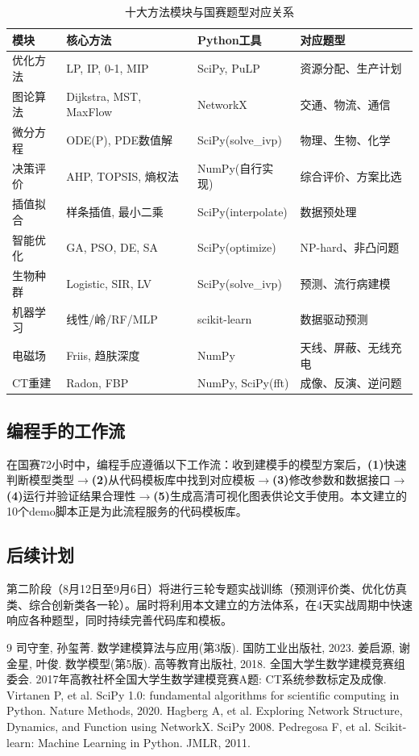 \documentclass[12pt,a4paper]{ctexart}
\begin{document}
\begin{table}[htbp]
\centering
\caption{十大方法模块与国赛题型对应关系}
\begin{tabular}{@{}llll@{}}
\toprule
\textbf{模块} & \textbf{核心方法} & \textbf{Python工具} & \textbf{对应题型} \\
\midrule
优化方法 & LP, IP, 0-1, MIP & SciPy, PuLP & 资源分配、生产计划 \\
图论算法 & Dijkstra, MST, MaxFlow & NetworkX & 交通、物流、通信 \\
微分方程 & ODE(P), PDE数值解 & SciPy(solve\_ivp) & 物理、生物、化学 \\
决策评价 & AHP, TOPSIS, 熵权法 & NumPy(自行实现) & 综合评价、方案比选 \\
插值拟合 & 样条插值, 最小二乘 & SciPy(interpolate) & 数据预处理 \\
智能优化 & GA, PSO, DE, SA & SciPy(optimize) & NP-hard、非凸问题 \\
生物种群 & Logistic, SIR, LV & SciPy(solve\_ivp) & 预测、流行病建模 \\
机器学习 & 线性/岭/RF/MLP & scikit-learn & 数据驱动预测 \\
电磁场 & Friis, 趋肤深度 & NumPy & 天线、屏蔽、无线充电 \\
CT重建 & Radon, FBP & NumPy, SciPy(fft) & 成像、反演、逆问题 \\
\bottomrule
\end{tabular}
\label{tab:summary}
\end{table}

\subsection{编程手的工作流}

在国赛72小时中，编程手应遵循以下工作流：收到建模手的模型方案后，\textbf{(1)}快速判断模型类型$\to$\textbf{(2)}从代码模板库中找到对应模板$\to$\textbf{(3)}修改参数和数据接口$\to$\textbf{(4)}运行并验证结果合理性$\to$\textbf{(5)}生成高清可视化图表供论文手使用。本文建立的10个demo脚本正是为此流程服务的代码模板库。

\subsection{后续计划}

第二阶段（8月12日至9月6日）将进行三轮专题实战训练（预测评价类、优化仿真类、综合创新类各一轮）。届时将利用本文建立的方法体系，在4天实战周期中快速响应各种题型，同时持续完善代码库和模板。

\begin{thebibliography}{9}
 司守奎, 孙玺菁. 数学建模算法与应用(第3版). 国防工业出版社, 2023.
 姜启源, 谢金星, 叶俊. 数学模型(第5版). 高等教育出版社, 2018.
 全国大学生数学建模竞赛组委会. 2017年高教社杯全国大学生数学建模竞赛A题: CT系统参数标定及成像.
 Virtanen P, et al. SciPy 1.0: fundamental algorithms for scientific computing in Python. Nature Methods, 2020.
 Hagberg A, et al. Exploring Network Structure, Dynamics, and Function using NetworkX. SciPy 2008.
 Pedregosa F, et al. Scikit-learn: Machine Learning in Python. JMLR, 2011.
\end{thebibliography}
\end{document}
